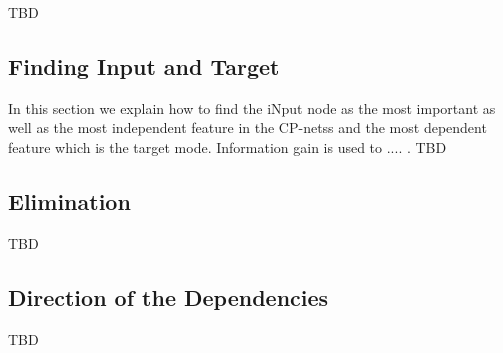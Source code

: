 \label{sec_approach}
TBD
\subsection{Finding Input and Target}
In this section we explain how to find the iNput node as the most important as well as the most independent feature in the CP-netss and the most dependent feature which is the target mode.
Information gain is used to .... .
TBD
\subsection{Elimination}
TBD
\subsection{Direction of the Dependencies}
TBD
